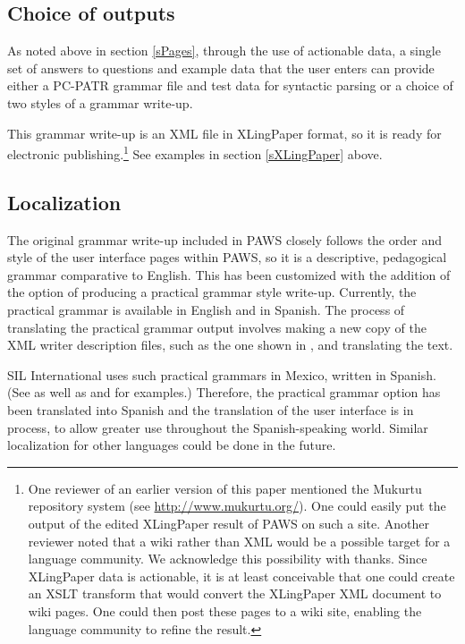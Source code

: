 \subsection{Choice of outputs} \label{sOutputs}
As noted above in section \ref{sPages}, through the use of actionable data, a single set of answers to questions and example data that the user enters can provide either a PC-PATR grammar file and test data for syntactic parsing or a choice of two styles of a grammar write-up.

This grammar write-up is an XML file in XLingPaper format, so it is ready for electronic publishing.\footnote{\label{nMukurtu}
 One reviewer of an earlier version of this paper mentioned the Mukurtu repository system (see \url{http://www.mukurtu.org/}). One could easily put the output of the edited XLingPaper result of {PAWS} on such a site. Another reviewer noted that a wiki rather than XML would be a possible target for a language community. We acknowledge this possibility with thanks. Since XLingPaper data is actionable, it is at least conceivable that one could create an XSLT transform that would convert the XLingPaper XML document to wiki pages. One could then post these pages to a wiki site, enabling the language community to refine the result.
} 
See examples in section \ref{sXLingPaper} above.

\subsection{Localization}\label{sLocal} 
The original grammar write-up included in PAWS closely follows the order and style of the user interface pages within PAWS, so it is a descriptive, pedagogical grammar comparative to English. This has been customized with the addition of the option of producing a practical grammar style write-up. Currently, the practical grammar is available in English and in Spanish. The process of translating the practical grammar output involves making a new copy of the XML writer description files, such as the one shown in , and translating the text.

SIL International uses such practical grammars in Mexico, written in Spanish. (See \citet{rHollenbach} as well as \citet{rPickettBlackMarcial} and \citet{rPersonsBlack} for examples.) Therefore, the practical grammar option has been translated into Spanish and the translation of the user interface is in process, to allow greater use throughout the Spanish-speaking world. Similar localization for other languages could be done in the future.

